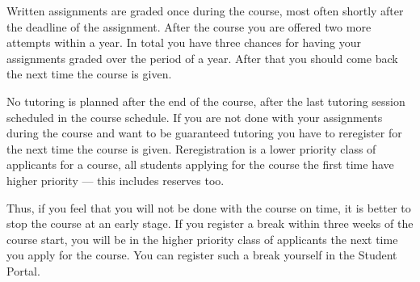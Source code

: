 Written assignments are graded once during the course, most often shortly after 
the deadline of the assignment.
After the course you are offered two more attempts within a year.
In total you have three chances for having your assignments graded over the 
period of a year.
After that you should come back the next time the course is given.

No tutoring is planned after the end of the course, \ie after the last 
tutoring session scheduled in the course schedule.
If you are not done with your assignments during the course and want to be 
guaranteed tutoring you have to reregister for the next time the course is 
given.
Reregistration is a lower priority class of applicants for a course, all 
students applying for the course the first time have higher priority --- this 
includes reserves too.


Thus, if you feel that you will not be done with the course on time, it is 
better to stop the course at an early stage.
If you register a break within three weeks of the course start, you will be in 
the higher priority class of applicants the next time you apply for the course.
You can register such a break yourself in the Student Portal.

